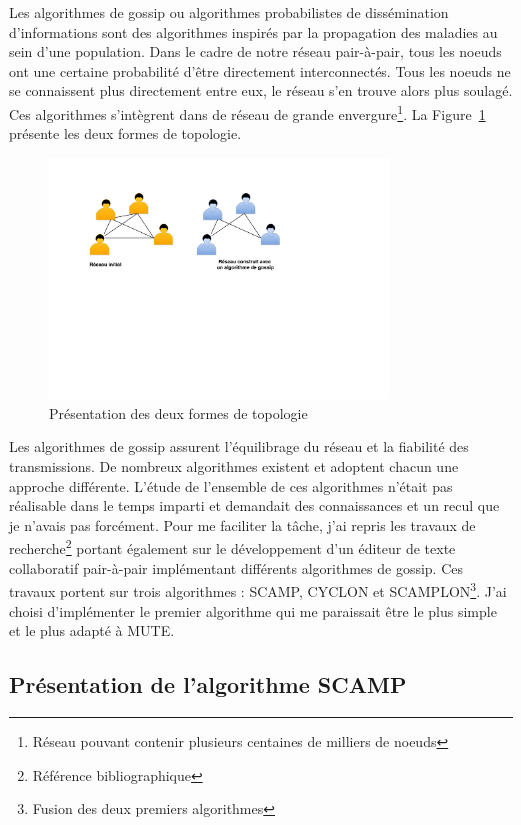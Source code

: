 \documentclass{tnreport}
\begin{document}
Les algorithmes de gossip ou algorithmes probabilistes de dissémination d'informations sont des algorithmes inspirés par la propagation des maladies au sein d'une population. Dans le cadre de notre réseau pair-à-pair, tous les noeuds ont une certaine probabilité d'être directement interconnectés. Tous les noeuds ne se connaissent plus directement entre eux, le réseau s'en trouve alors plus soulagé. Ces algorithmes s'intègrent dans de réseau de grande envergure\footnote{Réseau pouvant contenir plusieurs centaines de milliers de noeuds}.  La Figure~\ref{fig:topo-comp} présente les deux formes de topologie.

\begin{figure}[!h]
  \centering
  \includegraphics[width=9cm]{figures/topo-comp}
  \caption{Présentation des deux formes de topologie}
  \label{fig:topo-comp}
\end{figure}

Les algorithmes de gossip assurent l'équilibrage du réseau et la fiabilité des transmissions. De nombreux algorithmes existent et adoptent chacun une approche différente. L'étude de l'ensemble de ces algorithmes n'était pas réalisable dans le temps imparti et demandait des connaissances et un recul que je n'avais pas forcément. Pour me faciliter la tâche, j'ai repris les travaux de recherche\footnote{Référence bibliographique\cite{SCAMPLON}} portant également sur le développement d'un éditeur de texte collaboratif pair-à-pair implémentant différents algorithmes de gossip. Ces travaux portent sur trois algorithmes : SCAMP, CYCLON et SCAMPLON\footnote{Fusion des deux premiers algorithmes}. J'ai choisi d'implémenter le premier algorithme qui me paraissait être le plus simple et le plus adapté à MUTE.

\subsection{Présentation de l'algorithme SCAMP}
\end{document}
